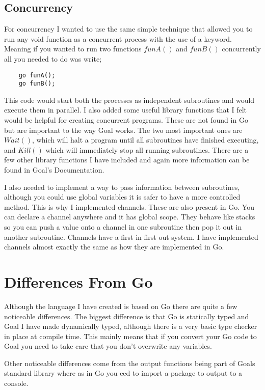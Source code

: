 \subsection{Concurrency}
\label{sec:concDes}

For concurrency I wanted to use the same simple technique that allowed you to run any void function as a concurrent process with the use of a keyword. Meaning if you wanted to run two functions $funA()$ and $funB()$ concurrently all you needed to do was write;

\begin{lstlisting}
	go funA();
	go funB();	
\end{lstlisting}
This code would start both the processes as independent subroutines and would execute them in parallel. I also added some useful library functions that I felt would be helpful for creating concurrent programs. These are not found in Go but are important to the way Goal works. The two most important ones are $Wait()$, which will halt a program until all subroutines have finished executing, and $Kill()$ which will immediately stop all running subroutines. There are a few other library functions I have included and again more information can be found in Goal's Documentation.  

I also needed to implement a way to pass information between subroutines, although you could use global variables it is safer to have a more controlled method. This is why I implemented channels. These are also present in Go. You can declare a channel anywhere and it has global scope. They behave like stacks so you can push a value onto a channel in one subroutine then pop it out in another subroutine. Channels have a first in first out system. I have implemented channels almost exactly the same as how they are implemented in Go. 

\section{Differences From Go}

Although the language I have created is based on Go there are quite a few noticeable differences. The biggest difference is that Go is statically typed and Goal I have made dynamically typed, although there is a very basic type checker in place at compile time. This mainly means that if you convert your Go code to Goal you need to take care that you don't overwrite any variables.

Other noticeable differences come from the output functions being part of Goals standard library where as in Go you eed to import a package to output to a console.

